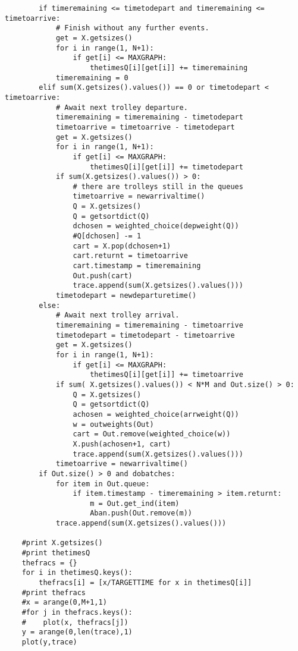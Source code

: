 \documentclass[english]{article}
\begin{document}
\begin{singlespace}
\begin{verbatim}
        if timeremaining <= timetodepart and timeremaining <= timetoarrive:
            # Finish without any further events.
            get = X.getsizes()        
            for i in range(1, N+1):
                if get[i] <= MAXGRAPH:
                    thetimesQ[i][get[i]] += timeremaining
            timeremaining = 0
        elif sum(X.getsizes().values()) == 0 or timetodepart < timetoarrive:
            # Await next trolley departure.
            timeremaining = timeremaining - timetodepart
            timetoarrive = timetoarrive - timetodepart
            get = X.getsizes()        
            for i in range(1, N+1):
                if get[i] <= MAXGRAPH:
                    thetimesQ[i][get[i]] += timetodepart
            if sum(X.getsizes().values()) > 0:       
                # there are trolleys still in the queues
                timetoarrive = newarrivaltime()
                Q = X.getsizes()
                Q = getsortdict(Q)
                dchosen = weighted_choice(depweight(Q))
                #Q[dchosen] -= 1
                cart = X.pop(dchosen+1)
                cart.returnt = timetoarrive
                cart.timestamp = timeremaining
                Out.push(cart)
                trace.append(sum(X.getsizes().values()))
            timetodepart = newdeparturetime()
        else:    
            # Await next trolley arrival.
            timeremaining = timeremaining - timetoarrive
            timetodepart = timetodepart - timetoarrive
            get = X.getsizes()        
            for i in range(1, N+1):
                if get[i] <= MAXGRAPH:
                    thetimesQ[i][get[i]] += timetoarrive
            if sum( X.getsizes().values()) < N*M and Out.size() > 0:
                Q = X.getsizes()
                Q = getsortdict(Q)            
                achosen = weighted_choice(arrweight(Q))
                w = outweights(Out)
                cart = Out.remove(weighted_choice(w))
                X.push(achosen+1, cart)
                trace.append(sum(X.getsizes().values()))
            timetoarrive = newarrivaltime()
        if Out.size() > 0 and dobatches:
            for item in Out.queue:
                if item.timestamp - timeremaining > item.returnt:
                    m = Out.get_ind(item)
                    Aban.push(Out.remove(m))
            trace.append(sum(X.getsizes().values()))
                
    #print X.getsizes()
    #print thetimesQ
    thefracs = {}
    for i in thetimesQ.keys():
        thefracs[i] = [x/TARGETTIME for x in thetimesQ[i]]
    #print thefracs
    #x = arange(0,M+1,1)
    #for j in thefracs.keys():
    #    plot(x, thefracs[j])
    y = arange(0,len(trace),1)
    plot(y,trace)
        

\end{verbatim}
\end{singlespace}
\end{document}
